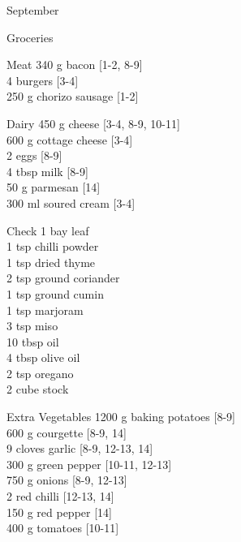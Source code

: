 \begin{menu}{September}
\begin{shoppinglist}{Groceries}
      \end{shoppinglist}%
      \par\vfil %
      \begin{shoppinglist}{Meat}
      340 g bacon {\scriptsize[1-2, 8-9]}\\
      4  burgers {\scriptsize[3-4]}\\
      250 g chorizo sausage {\scriptsize[1-2]}\\
      \end{shoppinglist}%
      \begin{shoppinglist}{Dairy}
      450 g cheese {\scriptsize[3-4, 8-9, 10-11]}\\
      600 g cottage cheese {\scriptsize[3-4]}\\
      2  eggs {\scriptsize[8-9]}\\
      4 tbsp milk {\scriptsize[8-9]}\\
      50 g parmesan {\scriptsize[14]}\\
      300 ml soured cream {\scriptsize[3-4]}\\
      \end{shoppinglist}%
      \par\vfil %
      \vfil\clearpage %
      \begin{shoppinglist}{Check}
      1  bay leaf \\
      1 tsp chilli powder \\
      1 tsp dried thyme \\
      2 tsp ground coriander \\
      1 tsp ground cumin \\
      1 tsp marjoram \\
      3 tsp miso \\
      10 tbsp oil \\
      4 tbsp olive oil \\
      2 tsp oregano \\
      2 cube stock \\
      \end{shoppinglist}%
      \begin{shoppinglist}{Extra Vegetables}
      1200 g baking potatoes {\scriptsize[8-9]}\\
      600 g courgette {\scriptsize[8-9, 14]}\\
      9 cloves garlic {\scriptsize[8-9, 12-13, 14]}\\
      300 g green pepper {\scriptsize[10-11, 12-13]}\\
      750 g onions {\scriptsize[8-9, 12-13]}\\
      2  red chilli {\scriptsize[12-13, 14]}\\
      150 g red pepper {\scriptsize[14]}\\
      400 g tomatoes {\scriptsize[10-11]}\\
      \end{shoppinglist}%
      \par\vfil %
    \vfil\clearpage
  

\end{menu}
